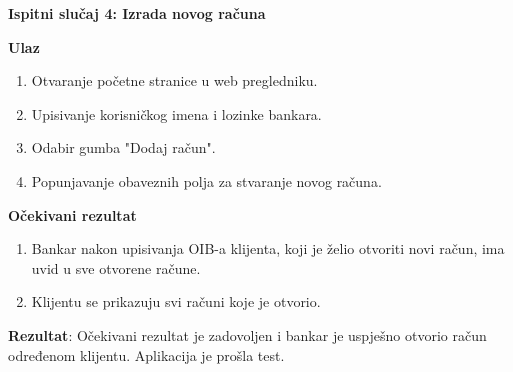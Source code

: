 	\textbf{Ispitni slučaj 4: Izrada novog računa} 
	
	\textbf{Ulaz}
	
	\begin{enumerate}
		
		\item Otvaranje početne stranice u web pregledniku.
		\item Upisivanje korisničkog imena i lozinke bankara.
		\item Odabir gumba "Dodaj račun".
		\item Popunjavanje obaveznih polja za stvaranje novog računa.
		
	\end{enumerate}
	
	\textbf{Očekivani rezultat}
	
	\begin{enumerate}
		\item Bankar nakon upisivanja OIB-a klijenta, koji je želio otvoriti novi račun, ima uvid u sve otvorene račune.
		\item Klijentu se prikazuju svi računi koje je otvorio.
	\end{enumerate}
	
	\textbf{Rezultat}: Očekivani rezultat je zadovoljen i bankar je uspješno otvorio račun određenom klijentu. Aplikacija je prošla test.
	
